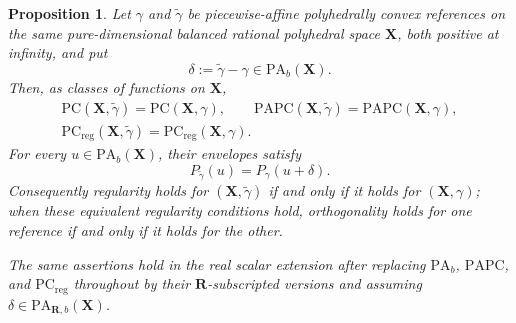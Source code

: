\documentclass[11pt,a4paper]{article}
\newtheorem{proposition}[proposition]{Proposition}
\theoremstyle{definition}
\theoremstyle{remark}
\begin{document}
\begin{proposition}\label{prop:frontier-polyhedral-bounded-reference-shift}
Let \(\gamma\) and \(\widetilde\gamma\) be piecewise-affine
polyhedrally convex references on the same pure-dimensional balanced
rational polyhedral space \(\mathbf X\), both positive at infinity, and put
\[
             \delta:=\widetilde\gamma-\gamma\in
             \mathrm{PA}_{b}(\mathbf X).
\]
Then, as classes of functions on \(\mathbf X\),
\[
\begin{gathered}
 \mathrm{PC}(\mathbf X,\widetilde\gamma)
 =\mathrm{PC}(\mathbf X,\gamma),\qquad
 \mathrm{PAPC}(\mathbf X,\widetilde\gamma)
 =\mathrm{PAPC}(\mathbf X,\gamma),\\
 \mathrm{PC}_{\mathrm{reg}}(\mathbf X,\widetilde\gamma)
 =\mathrm{PC}_{\mathrm{reg}}(\mathbf X,\gamma).
\end{gathered}
\]
For every \(u\in\mathrm{PA}_{b}(\mathbf X)\), their envelopes satisfy
\[
 P_{\widetilde\gamma}(u)=P_\gamma(u+\delta).
 \tag{\(\star\)}\label{eq:frontier-polyhedral-bounded-shift-envelope}
\]
Consequently regularity holds for \((\mathbf X,\widetilde\gamma)\) if and
only if it holds for \((\mathbf X,\gamma)\); when these equivalent
regularity conditions hold, orthogonality holds for one reference if and
only if it holds for the other.

The same assertions hold in the real scalar extension after replacing
\(\mathrm{PA}_{b}\), \(\mathrm{PAPC}\), and
\(\mathrm{PC}_{\mathrm{reg}}\) throughout by their
\(\mathbf R\)-subscripted versions and assuming
\(\delta\in\mathrm{PA}_{\mathbf R,b}(\mathbf X)\).
\end{proposition}
\end{document}

